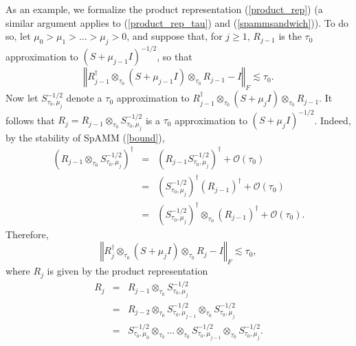 \documentclass[letterpaper,twocolumn,amsmath,amsfont,amssymb,english,aps,jcp,preprintnumbers,groupaddress,nofootinbib,tightenlines,floatfix]{revtex4}
\newcommand{\mat}[1]{\boldsymbol{#1}}
\theoremstyle{plain}
\theoremstyle{remark}
\theoremstyle{plain}
\begin{document}
As an example, we formalize the product representation (\ref{product_rep}) (a similar argument applies to (\ref{product_rep_tau}) and (\ref{spammsandwich})). To do so, let $\mu_{0}>\mu_{1}>\dots>\mu_{j}>0$, and suppose
that, for $j\geq1$, $R_{j-1}$ is the $\tau_{0}$ approximation to
$\left(S+\mu_{j-1}I\right)^{-1/2}$, so that 
\[
\left\Vert R_{j-1}^{\dagger}\otimes_{\tau_{0}}\left(S+\mu_{j-1}I\right)\otimes_{\tau_{0}}R_{j-1}-I\right\Vert _{F}\lesssim\tau_{0}.
\]
Now let $S_{\tau_{0},\mu_{j}}^{-1/2}$ denote a $\tau_{0}$ approximation
to $R_{j-1}^{\dagger}\otimes_{\tau_{0}}\left(S+\mu_{j}I\right)\otimes_{\tau_{0}}R_{j-1}$.
It follows that $R_{j}=R_{j-1}\otimes_{\tau_{0}}S_{\tau_{0},\mu_{j}}^{-1/2}$
is a $\tau_{0}$ approximation to $\left(S+\mu_{j}I\right)^{-1/2}$. 
Indeed, by the stability of SpAMM (\ref{bound}),
\begin{eqnarray*}
\left(R_{j-1}\otimes_{\tau_{0}}S_{\tau_{0},\mu_{j}}^{-1/2}\right)^{\dagger} & = & \left(R_{j-1}S_{\tau_{0},\mu_{j}}^{-1/2}\right)^{\dagger}+\mathcal{O}\left(\tau_{0}\right)\\
 & = & \left(S_{\tau_{0},\mu_{j}}^{-1/2}\right)^{\dagger}\left(R_{j-1}\right)^{\dagger}+\mathcal{O}\left(\tau_{0}\right)\\
 & = & \left(S_{\tau_{0},\mu_{j}}^{-1/2}\right)^{\dagger}\otimes_{\tau_{0}}\left(R_{j-1}\right)^{\dagger}+\mathcal{O}\left(\tau_{0}\right).
\end{eqnarray*}
Therefore,  \[
\left\Vert R_{j}^{\dagger}\otimes_{\tau_{0}}\left(S+\mu_{j}I\right)\otimes_{\tau_{0}}R_{j}-I\right\Vert _{F}\lesssim\tau_{0},
\]
where $R_{j}$ is given by  the product representation
\begin{eqnarray*}
R_{j} & = & R_{j-1}\otimes_{\tau_{0}}S_{\tau_{0},\mu_{j}}^{-1/2}\\
 & = & R_{j-2}\otimes_{\tau_{0}}S_{\tau_{0},\mu_{j-1}}^{-1/2}\otimes_{\tau_{0}}S_{\tau_{0},\mu_{j}}^{-1/2}\\
 & = & S_{\tau_{0},\mu_{0}}^{-1/2}\otimes_{\tau_{0}}\dots\otimes_{\tau_{0}}S_{\tau_{0},\mu_{j-1}}^{-1/2}\otimes_{\tau_{0}}S_{\tau_{0},\mu_{j}}^{-1/2}.
\end{eqnarray*}

\end{document}
